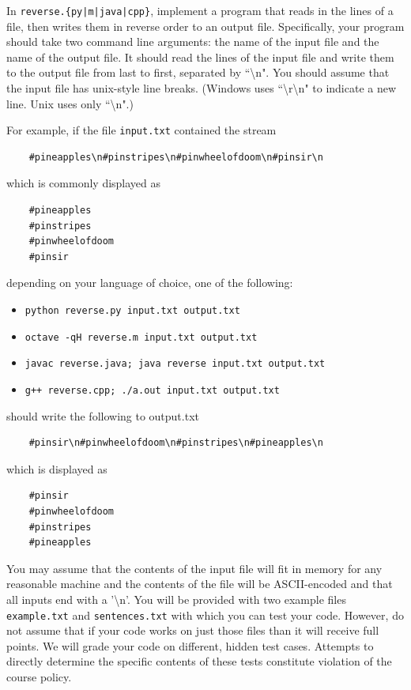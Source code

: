 \documentclass[12pt]{article}
\begin{document}
In \texttt{reverse.\{py|m|java|cpp\}}, implement a program that reads in the lines of a file, then writes them in reverse order to an output file. Specifically, your program should take two command line arguments: the name of the input file and the name of the output file. It should read the lines of the input file and write them to the output file from last to first, separated by ``\textbackslash n". You should assume that the input file has unix-style line breaks. (Windows uses ``\textbackslash r\textbackslash n" to indicate a new line. Unix uses only ``\textbackslash n".)

For example, if the file \texttt{input.txt} contained the stream

\begin{verbatim}
    #pineapples\n#pinstripes\n#pinwheelofdoom\n#pinsir\n
\end{verbatim}

which is commonly displayed as
\begin{verbatim}
    #pineapples
    #pinstripes
    #pinwheelofdoom
    #pinsir
\end{verbatim}

depending on your language of choice, one of the following:

\begin{itemize}
    \item \texttt{python reverse.py input.txt output.txt}
    \item \texttt{octave -qH reverse.m input.txt output.txt}
    \item \texttt{javac reverse.java; java reverse input.txt output.txt}
    \item \texttt{g++ reverse.cpp; ./a.out input.txt output.txt}
\end{itemize}

should write the following to output.txt

\begin{verbatim}
    #pinsir\n#pinwheelofdoom\n#pinstripes\n#pineapples\n
\end{verbatim}

which is displayed as

\begin{verbatim}
    #pinsir
    #pinwheelofdoom
    #pinstripes
    #pineapples
\end{verbatim}

You may assume that the contents of the input file will fit in memory for any reasonable machine and the contents of the file will be ASCII-encoded and that all inputs end with a '\textbackslash n'. You will be provided with two example files \texttt{example.txt} and \texttt{sentences.txt} with which you can test your code. However, do not assume that if your code works on just those files than it will receive full points. We will grade your code on different, hidden test cases. Attempts to directly determine the specific contents of these tests constitute violation of the course policy.
\end{document}
